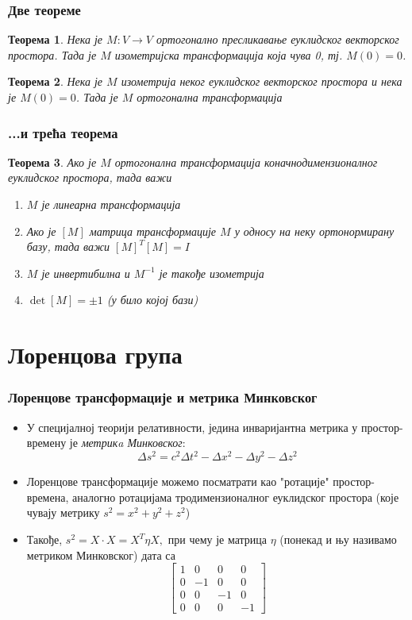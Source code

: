 \documentclass{beamer}
\theoremstyle{plain}
\newtheorem{thm}{Теорема}
\theoremstyle{definition}
\begin{document}
\begin{frame}
\frametitle{Две теореме}
\begin{thm}
Нека је $M:V\to V$ ортогонално пресликавање еуклидског векторског простора. Тада је $M$ изометријска трансформација која чува 0, тј. $M(0) = 0$.
\end{thm}
\begin{thm}
Нека је $M$ изометрија неког еуклидског векторског простора и нека је $M(0) = 0$. Тада је $M$ ортогонална трансформација
\end{thm}
\end{frame}

\begin{frame}
\frametitle{...и трећа теорема}
\begin{thm}
Ако је $M$ ортогонална трансформација коначнодимензионалног еуклидског простора, тада важи
\begin{enumerate}
  \item $M$ је линеарна трансформација
  \item Ако је $[M]$ матрица трансформације $M$ у односу на неку ортонормирану базу, тада важи $[M]^T[M] = I$
  \item $M$ је инвертибилна и $M^{-1}$ је такође изометрија
  \item $\det [M]=\pm 1$ (у било којој бази)
\end{enumerate}
\end{thm}
\end{frame}

\section{Лоренцова група}

\begin{frame}
\frametitle{Лоренцове трансформације и метрика Минковског}
\begin{itemize}
\item У специјалној теорији релативности, једина инваријантна метрика у простор-времену је \emph{метрикa Минковског}:
$$\Delta s^2 = c^2\Delta t^2 - \Delta x^2 - \Delta y^2 - \Delta z^2$$
\item Лоренцове трансформације можемо посматрати као "ротације" простор-времена, аналогно ротацијама тродимензионалног еуклидског простора (које чувају метрику $s^2 = x^2+y^2+z^2$)
\item Такође, $s^2 = X\cdot X = X^T\eta X,$
при чему је матрица $\eta$ (понекад и њу називамо метриком Минковског) дата са
$$\begin{bmatrix}
    1 &  0 &  0 &  0\\
    0 & -1 &  0 &  0\\
    0 &  0 & -1 &  0\\
    0 &  0 &  0 & -1
  \end{bmatrix}$$
\end{itemize}
\end{frame}
\end{document}
